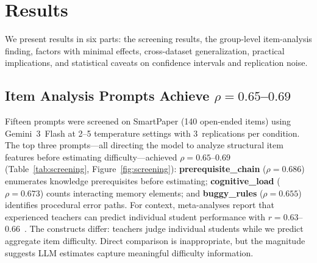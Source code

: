 \documentclass[runningheads]{llncs}
\begin{document}
\section{Results}\label{sec:results}

We present results in six parts: the screening results, the group-level item-analysis finding, factors with minimal effects, cross-dataset generalization, practical implications, and statistical caveats on confidence intervals and replication noise.

\subsection{Item Analysis Prompts Achieve $\rho=0.65$--$0.69$}

Fifteen prompts were screened on SmartPaper (140 open-ended items) using Gemini~3~Flash at 2--5 temperature settings with 3~replications per condition. The top three prompts---all directing the model to analyze structural item features before estimating difficulty---achieved $\rho=0.65$--$0.69$ (Table~\ref{tab:screening}, Figure~\ref{fig:screening}): \textbf{prerequisite\_chain} ($\rho=0.686$) enumerates knowledge prerequisites before estimating; \textbf{cognitive\_load} ($\rho=0.673$) counts interacting memory elements; and \textbf{buggy\_rules} ($\rho=0.655$) identifies procedural error paths. For context, meta-analyses report that experienced teachers can predict individual student performance with $r=0.63$--$0.66$~\cite{hoge1989,sudkamp2012}. The constructs differ: teachers judge individual students while we predict aggregate item difficulty. Direct comparison is inappropriate, but the magnitude suggests LLM estimates capture meaningful difficulty information.
\end{document}
